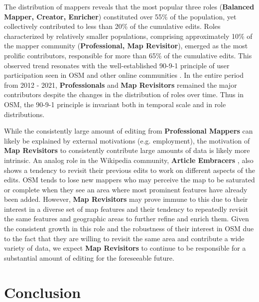\documentclass[manuscript,screen,review]{acmart}
\begin{document}
The distribution of mappers reveals that the most popular three roles (\textbf{Balanced Mapper, Creator, Enricher}) constituted over 55\% of the population, yet collectively contributed to less than 20\% of the cumulative edits. Roles characterized by relatively smaller populations, comprising approximately 10\% of the mapper community (\textbf{Professional, Map Revisitor}), emerged as the most prolific contributors, responsible for more than 65\% of the cumulative edits. This observed trend resonates with the well-established 90-9-1 principle of user participation seen in OSM and other online communities \cite{BeginDR18, Yamashita15}. In the entire period from 2012 - 2021, \textbf{Professionals} and \textbf{Map Revisitors} remained the major contributors despite the changes in the distribution of roles over time. Thus in OSM, the 90-9-1 principle is invariant both in temporal scale and in role distributions.

While the consistently large amount of editing from \textbf{Professional Mappers} can likely be explained by external motivations (e.g. employment), the motivation of \textbf{Map Revisitors} to consistently contribute large amounts of data is likely more intrinsic. An analog role in the Wikipedia community,  \textbf{Article Embracers} \cite{Arazy17}, also shows a tendency to revisit their previous edits to work on different aspects of the edits. OSM tends to lose new mappers who may perceive the map to be saturated or complete when they see an area where most prominent features have already been added. However, \textbf{Map Revisitors} may prove immune to this due to their interest in a diverse set of map features and their tendency to repeatedly revisit the same features and geographic areas to further refine and enrich them. Given the consistent growth in this role and the robustness of their interest in OSM due to the fact that they are willing to revisit the same area and contribute a wide variety of data, we expect \textbf{Map Revisitors} to continue to be responsible for a substantial amount of editing for the foreseeable future. 

\section{Conclusion}
\end{document}
